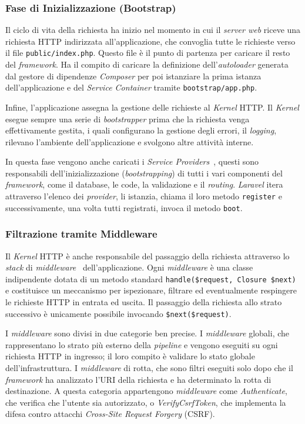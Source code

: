 \subsubsection*{Fase di Inizializzazione (Bootstrap)}
Il ciclo di vita della richiesta ha inizio nel momento in cui il \textit{server web} riceve una richiesta HTTP indirizzata all’applicazione, che convoglia tutte le richieste verso il file \texttt{public/index.php}. Questo file è il punto di partenza per caricare il resto del \textit{framework}. Ha il compito di caricare la definizione dell’\textit{autoloader} generata dal gestore di dipendenze \textit{Composer} per poi istanziare la prima istanza dell’applicazione e del \textit{Service Container} tramite \texttt{bootstrap/app.php}.

Infine, l’applicazione assegna la gestione delle richieste al \textit{Kernel} HTTP. Il \textit{Kernel} esegue sempre una serie di \textit{bootstrapper} prima che la richiesta venga effettivamente gestita, i quali configurano la gestione degli errori, il \textit{logging}, rilevano l'ambiente dell'applicazione e svolgono altre attività interne.

In questa fase vengono anche caricati i \textit{Service Providers}~\autocite{ServiceProvidersLaravel}, questi sono responsabili dell’inizializzazione (\textit{bootstrapping}) di tutti i vari componenti del \textit{framework}, come il database, le code, la validazione e il \textit{routing}. \textit{Laravel} itera attraverso l'elenco dei \textit{provider}, li istanzia, chiama il loro metodo \texttt{register} e successivamente, una volta tutti registrati, invoca il metodo \texttt{boot}. 

\subsubsection*{Filtrazione tramite Middleware}
Il \textit{Kernel} HTTP è anche responsabile del passaggio della richiesta attraverso lo \textit{stack} di \textit{middleware}~\autocite{MiddlewareLaravel13x} dell’applicazione. Ogni \textit{middleware} è una classe indipendente dotata di un metodo standard \texttt{handle(\$request, Closure \$next)} e costituisce un meccanismo per ispezionare, filtrare ed eventualmente respingere le richieste HTTP in entrata ed uscita. Il passaggio della richiesta allo strato successivo è unicamente possibile invocando \texttt{\$next(\$request)}.

I \textit{middleware} sono divisi in due categorie ben precise. I \textit{middleware} globali, che rappresentano lo strato più esterno della \textit{pipeline} e vengono eseguiti su ogni richiesta HTTP in ingresso; il loro compito è validare lo stato globale dell’infrastruttura. I \textit{middleware} di rotta, che sono filtri eseguiti solo dopo che il \textit{framework} ha analizzato l'URI della richiesta e ha determinato la rotta di destinazione. A questa categoria appartengono \textit{middleware} come \textit{Authenticate}, che verifica che l’utente sia autorizzato, o \textit{VerifyCsrfToken}, che implementa la difesa contro attacchi \textit{Cross-Site Request Forgery} (CSRF).


